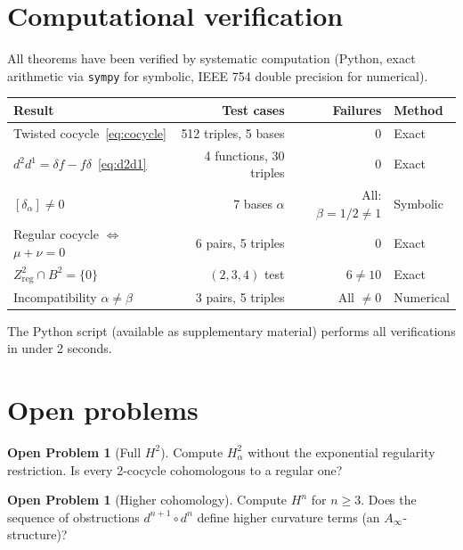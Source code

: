 \documentclass[11pt,a4paper]{article}
\theoremstyle{plain}
\theoremstyle{definition}
\newtheorem{problem}[theorem]{Open Problem}
\theoremstyle{remark}
\begin{document}
\section{Computational verification}
\label{sec:verification}

All theorems have been verified by systematic computation (Python, 
exact arithmetic via \texttt{sympy} for symbolic, IEEE 754 double 
precision for numerical).

\begin{center}
\begin{tabular}{lrrl}
\toprule
\textbf{Result} & \textbf{Test cases} & \textbf{Failures} & 
\textbf{Method} \\
\midrule
Twisted cocycle~\eqref{eq:cocycle} & 512 triples, 5 bases & 0 & 
Exact \\
$d^2 d^1 = \delta f - f\delta$~\eqref{eq:d2d1} & 4 functions, 
30 triples & 0 & Exact \\
$[\delta_\alpha] \neq 0$ & 7 bases $\alpha$ & All: $\beta = 1/2 
\neq 1$ & Symbolic \\
Regular cocycle $\Leftrightarrow$ $\mu + \nu = 0$ & 6 pairs, 
5 triples & 0 & Exact \\
$Z^2_{\mathrm{reg}} \cap B^2 = \{0\}$ & $(2,3,4)$ test & 
$6 \neq 10$ & Exact \\
Incompatibility $\alpha \neq \beta$ & 3 pairs, 5 triples & All 
$\neq 0$ & Numerical \\
\bottomrule
\end{tabular}
\end{center}

The Python script (available as supplementary material) performs all 
verifications in under 2 seconds.

\section{Open problems}
\label{sec:open}

\begin{problem}[Full $H^2$]
\label{prob:full-H2}
Compute $H^2_\alpha$ without the exponential regularity restriction. 
Is every 2-cocycle cohomologous to a regular one?
\end{problem}

\begin{problem}[Higher cohomology]
\label{prob:higher}
Compute $H^n$ for $n \geq 3$. Does the sequence of obstructions 
$d^{n+1} \circ d^n$ define higher curvature terms (an 
$A_\infty$-structure)?
\end{problem}
\end{document}
